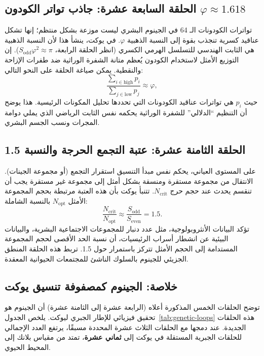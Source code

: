 \documentclass[11pt,a4paper]{article}
\newcommand{\Sodd}{S_{\mathrm{odd}}}
\newcommand{\Seven}{S_{\mathrm{even}}}
\begin{document}
	\subsection{الحلقة السابعة عشرة: جاذب تواتر الكودون \(\varphi \approx 1.618\)}
	
	تواترات الكودونات الـ 64 في الجينوم البشري ليست موزعة بشكل منتظم؛ إنها تشكل عناقيد كسرية تنجذب بقوة إلى النسبة الذهبية \(\varphi\). في يوكت، ينشأ هذا لأن النسبة الذهبية هي الثابت الهندسي للتسلسل الهرمي الكسري (انظر الحلقة الرابعة، \(\Sodd\varphi^2 \approx \pi\)). إن التوزيع الأمثل لاستخدام الكودون يُعظم متانة الشفرة الوراثية ضد طفرات الإزاحة والنقطية. يمكن صياغة الحلقة على النحو التالي:
	\begin{equation}
		\boxed{ \frac{\sum_{i \in \text{high}} p_i}{\sum_{j \in \text{low}} p_j} \approx \varphi },
	\end{equation}
	حيث \(p_i\) هي تواترات عناقيد الكودونات التي تحددها تحليل المكونات الرئيسية. هذا يوضح أن التنظيم ``الدلالي'' للشفرة الوراثية يحكمه نفس الثابت الرياضي الذي يملي دوامة المجرات ونسب الجسم البشري.
	
	\subsection{الحلقة الثامنة عشرة: عتبة التجمع الحرجة والنسبة 1.5}
	
	على المستوى العياني، يحكم نفس مبدأ التنسيق استقرار التجمع (أو مجموعة الجينات). الانتقال من مجموعة مستقرة ومنسقة بشكل أمثل إلى مجموعة غير مستقرة يجب أن تنقسم يحدث عند حجم حرج \(N_{\mathrm{crit}}\). تتنبأ يوكت بأن هذه العتبة مرتبطة بحجم المجموعة الأمثل \(N_{\mathrm{opt}}\) بالنسبة الشاملة:
	\begin{equation}
		\boxed{ \frac{N_{\mathrm{crit}}}{N_{\mathrm{opt}}} \approx \frac{\Sodd}{\Seven} = 1.5 }.
	\end{equation}
	تؤكد البيانات الأنثروبولوجية، مثل عدد دنبار للمجموعات الاجتماعية البشرية، والبيانات البيئية عن انشطار أسراب الرئيسيات، أن نسبة الحد الأقصى لحجم المجموعة المستدامة إلى الحجم الأمثل تتركز باستمرار حول 1.5. تربط هذه الحلقة المنطق الجزيئي للجينوم بالسلوك الناشئ للمجتمعات الحيوانية المعقدة.
	
	\subsection{خلاصة: الجينوم كمصفوفة تنسيق يوكت}
	
	توضح الحلقات الخمس المذكورة أعلاه (الرابعة عشرة إلى الثامنة عشرة) أن الجينوم هو تحقيق فيزيائي للإطار الجبري ليوكت. يلخص الجدول~\ref{tab:genetic-loops} هذه الحلقات الجديدة. عند دمجها مع الحلقات الثلاث عشرة المحددة مسبقًا، يرتفع العدد الإجمالي للحلقات الجبرية المستقلة في يوكت إلى \textbf{ثماني عشرة}، تمتد من مقياس بلانك إلى المحيط الحيوي.
	
\end{document}
